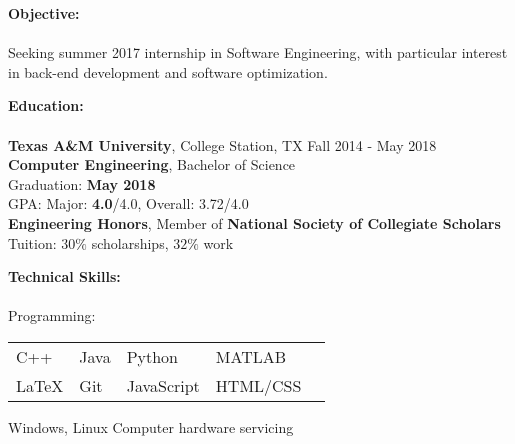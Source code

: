 \documentclass[12pt]{article}
\begin{document}
\begin{flushleft}
\begin{outline}[compactitem]

\newcommand{\upspace}{\vspace{-1.5px}}
\newcommand{\zzz}[1]{\upspace \0 \textbf{#1} \\ \vspace{-0.8\baselineskip} \hrulefill \vspace{-2px} \\ }
\renewcommand\labelitemii{\labelitemi}
\let\oldOne\1\let\oldTwo\2\let\oldThree\3\let\oldFour\4
\renewcommand{\1}{\upspace \oldOne  }
\renewcommand{\2}{\upspace \oldTwo  }
\renewcommand{\3}{\upspace \oldThree}
\renewcommand{\4}{\upspace \oldFour }




\zzz{Objective:}
  \1 Seeking summer 2017 internship in Software Engineering, with particular interest in back-end development and software optimization.

\zzz{Education:}
  \1 \textbf{Texas A\&M University}, College Station, TX \hfill Fall 2014 - May 2018
  \\ \textbf{Computer Engineering}, Bachelor of Science
  \\ Graduation: \textbf{May 2018}
  \\ GPA:  Major: \textbf{4.0}/4.0, Overall: 3.72/4.0
  \\ \textbf{Engineering Honors}, Member of \textbf{National Society of Collegiate Scholars}
  \\ Tuition: $30\%$ scholarships, $32\%$ work

\zzz{Technical Skills:}
  \1 Programming:
    \begin{tabularx}{\textwidth}{X X X X X}
      C++    & Java  & Python      & MATLAB   \upspace \\
      LaTeX  & Git   & JavaScript  & HTML/CSS \upspace \\
    \end{tabularx}
    \vspace{-5px}\upspace
  \1 
    Windows, Linux
    \hfill{}\hspace{1px}
    Computer hardware servicing
    \hfill
    \hfill


\end{outline}
\end{flushleft}
\end{document}
